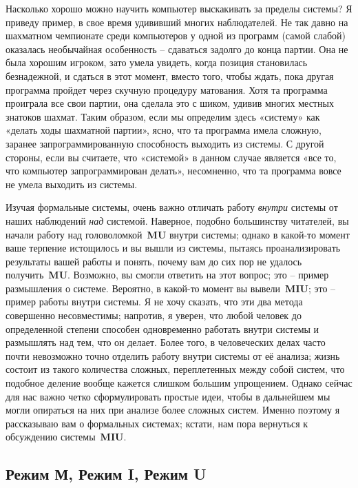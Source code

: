 \documentclass[../main.tex]{subfiles}
\begin{document}
Насколько хорошо можно научить компьютер выскакивать за пределы системы? Я приведу пример, в свое время удививший многих наблюдателей. Не так давно на шахматном чемпионате среди компьютеров у одной из программ (самой слабой) оказалась необычайная особенность \--- сдаваться задолго до конца партии. Она не была хорошим игроком, зато умела увидеть, когда позиция становилась безнадежной, и сдаться в этот момент, вместо того, чтобы ждать, пока другая программа пройдет через скучную процедуру матования. Хотя та программа проиграла все свои партии, она сделала это с шиком, удивив многих местных знатоков шахмат. Таким образом, если мы определим здесь «систему» как «делать ходы шахматной партии», ясно, что та программа имела сложную, заранее запрограммированную способность выходить из системы. С другой стороны, если вы считаете, что «системой» в данном случае является «все то, что компьютер запрограммирован делать», несомненно, что та программа вовсе не умела выходить из системы.

Изучая формальные системы, очень важно отличать работу \emph{внутри} системы от наших наблюдений \emph{над} системой. Наверное, подобно большинству читателей, вы начали работу над головоломкой~\textbf{MU} внутри системы; однако в какой-то момент ваше терпение истощилось и вы вышли из системы, пытаясь проанализировать результаты вашей работы и понять, почему вам до сих пор не удалось получить~\textbf{MU}. Возможно, вы смогли ответить на этот вопрос; это \--- пример размышления о системе. Вероятно, в какой-то момент вы вывели~\textbf{MIU}; это \--- пример работы внутри системы. Я не хочу сказать, что эти два метода совершенно несовместимы; напротив, я уверен, что любой человек до определенной степени способен одновременно работать внутри системы и размышлять над тем, что он делает. Более того, в человеческих делах часто почти невозможно точно отделить работу внутри системы от её анализа; жизнь состоит из такого количества сложных, переплетенных между собой систем, что подобное деление вообще кажется слишком большим упрощением. Однако сейчас для нас важно четко сформулировать простые идеи, чтобы в дальнейшем мы могли опираться на них при анализе более сложных систем. Именно поэтому я рассказываю вам о формальных системах; кстати, нам пора вернуться к обсуждению системы~\textbf{MIU}.


\subsection{Режим М, Режим I, Режим U}
\end{document}
